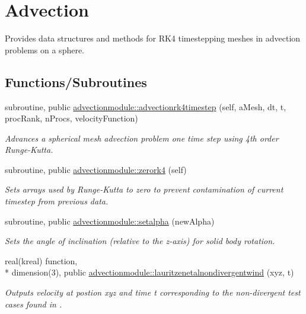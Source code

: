 \hypertarget{group__AdvectionRK4}{\section{Advection}
\label{group__AdvectionRK4}
}


Provides data structures and methods for R\+K4 timestepping meshes in advection problems on a sphere.  


\subsection*{Functions/\+Subroutines}
\begin{DoxyCompactItemize}
\item 
subroutine, public \hyperlink{group__AdvectionRK4_ga9a42b57d9bea0b541418b2bb32ae1ba1}{advectionmodule\+::advectionrk4timestep} (self, a\+Mesh, dt, t, proc\+Rank, n\+Procs, velocity\+Function)
\begin{DoxyCompactList}\small\item\em Advances a spherical mesh advection problem one time step using 4th order Runge-\/\+Kutta. \end{DoxyCompactList}\item 
subroutine, public \hyperlink{group__AdvectionRK4_ga60bf7e4fea5c15f0e916c04888b9770b}{advectionmodule\+::zerork4} (self)
\begin{DoxyCompactList}\small\item\em Sets arrays used by Runge-\/\+Kutta to zero to prevent contamination of current timestep from previous data. \end{DoxyCompactList}\item 
subroutine, public \hyperlink{group__AdvectionRK4_ga0eaf17769aa944b4bded630e3eb300c1}{advectionmodule\+::setalpha} (new\+Alpha)
\begin{DoxyCompactList}\small\item\em Sets the angle of inclination (relative to the z-\/axis) for solid body rotation. \end{DoxyCompactList}\item 
real(kreal) function, \\*
dimension(3), public \hyperlink{group__AdvectionRK4_ga7f11298031417d6f2c3987bd4b363c37}{advectionmodule\+::lauritzenetalnondivergentwind} (xyz, t)
\begin{DoxyCompactList}\small\item\em Outputs velocity at postion xyz and time t corresponding to the non-\/divergent test cases found in \cite{LauritzenEtAl2012}. \end{DoxyCompactList}\item 

\end{DoxyCompactItemize}
